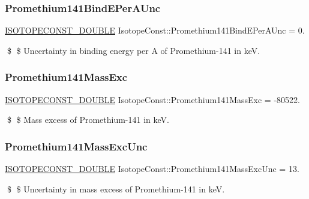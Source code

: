 \subsubsection{\texorpdfstring{Promethium141\+Bind\+E\+Per\+A\+Unc}{Promethium141BindEPerAUnc}}
{\footnotesize\ttfamily \mbox{\hyperlink{group___isotope_const-_macros_ga8f45a7272ce02c0b4c65c44636ed719a}{I\+S\+O\+T\+O\+P\+E\+C\+O\+N\+S\+T\+\_\+\+D\+O\+U\+B\+LE}} Isotope\+Const\+::\+Promethium141\+Bind\+E\+Per\+A\+Unc = 0.}

\$ \$ Uncertainty in binding energy per A of Promethium-\/141 in keV. \mbox{\label{group___isotope_const-_promethium-_pm141_ga6bfc1cf4bb0b4eaa7d376305014d0722}} 
\subsubsection{\texorpdfstring{Promethium141\+Mass\+Exc}{Promethium141MassExc}}
{\footnotesize\ttfamily \mbox{\hyperlink{group___isotope_const-_macros_ga8f45a7272ce02c0b4c65c44636ed719a}{I\+S\+O\+T\+O\+P\+E\+C\+O\+N\+S\+T\+\_\+\+D\+O\+U\+B\+LE}} Isotope\+Const\+::\+Promethium141\+Mass\+Exc = -\/80522.}

\$ \$ Mass excess of Promethium-\/141 in keV. \mbox{\label{group___isotope_const-_promethium-_pm141_ga9f46c8d3cf422bbe177f2b35090adb3d}} 
\subsubsection{\texorpdfstring{Promethium141\+Mass\+Exc\+Unc}{Promethium141MassExcUnc}}
{\footnotesize\ttfamily \mbox{\hyperlink{group___isotope_const-_macros_ga8f45a7272ce02c0b4c65c44636ed719a}{I\+S\+O\+T\+O\+P\+E\+C\+O\+N\+S\+T\+\_\+\+D\+O\+U\+B\+LE}} Isotope\+Const\+::\+Promethium141\+Mass\+Exc\+Unc = 13.}

\$ \$ Uncertainty in mass excess of Promethium-\/141 in keV. \mbox{\label{group___isotope_const-_promethium-_pm141_ga369d68e8c116a5f956739d0ae24d56c0}} 
